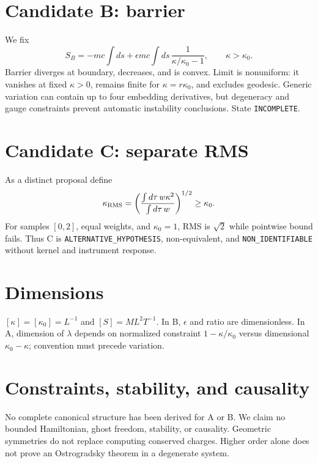 \documentclass[11pt,a4paper]{article}
\begin{document}
\section{Candidate B: barrier}\label{sec:p2-b}
We fix
\begin{equation}\label{eq:p2-barrier}
S_B=-mc\int ds+\epsilon mc\int ds\,\frac{1}{\kappa/\kappa_0-1},
\qquad \kappa>\kappa_0.
\end{equation}
Barrier diverges at boundary, decreases, and is convex. Limit is nonuniform: it vanishes at fixed $\kappa>0$, remains finite for $\kappa=r\kappa_0$, and excludes geodesic. Generic variation can contain up to four embedding derivatives, but degeneracy and gauge constraints prevent automatic instability conclusions. State \texttt{INCOMPLETE}.

\section{Candidate C: separate RMS}\label{sec:p2-c}
As a distinct proposal define
\begin{equation}\label{eq:p2-rms}
\kappa_{\rm RMS}=\left(\frac{\int d\tau\,w\kappa^2}{\int d\tau\,w}\right)^{1/2}\ge\kappa_0.
\end{equation}
For samples $[0,2]$, equal weights, and $\kappa_0=1$, RMS is $\sqrt2$ while pointwise bound fails. Thus C is \texttt{ALTERNATIVE\_HYPOTHESIS}, non-equivalent, and \texttt{NON\_IDENTIFIABLE} without kernel and instrument response.

\section{Dimensions}\label{sec:p2-dimensions}
$[\kappa]=[\kappa_0]=L^{-1}$ and $[S]=ML^2T^{-1}$. In B, $\epsilon$ and ratio are dimensionless. In A, dimension of $\lambda$ depends on normalized constraint $1-\kappa/\kappa_0$ versus dimensional $\kappa_0-\kappa$; convention must precede variation.

\section{Constraints, stability, and causality}\label{sec:p2-stability}
No complete canonical structure has been derived for A or B. We claim no bounded Hamiltonian, ghost freedom, stability, or causality. Geometric symmetries do not replace computing conserved charges. Higher order alone does not prove an Ostrogradsky theorem in a degenerate system.
\end{document}
